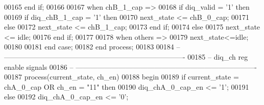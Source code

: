 \begin{DoxyCode}
00165          \textcolor{keywordflow}{end} \textcolor{keywordflow}{if};
00166          
00167       \textcolor{keywordflow}{when} \textcolor{vhdlchar}{chB\_1\_cap} \textcolor{vhdlchar}{=}\textcolor{vhdlchar}{>}
00168          \textcolor{keywordflow}{if} \textcolor{vhdlchar}{diq_valid} \textcolor{vhdlchar}{=} \textcolor{vhdlchar}{'}\textcolor{vhdllogic}{}\textcolor{vhdllogic}{1}\textcolor{vhdlchar}{'} \textcolor{keywordflow}{then}         
00169             \textcolor{keywordflow}{if} \textcolor{vhdlchar}{diq_chB_1_cap} \textcolor{vhdlchar}{=} \textcolor{vhdlchar}{'}\textcolor{vhdllogic}{}\textcolor{vhdllogic}{1}\textcolor{vhdlchar}{'} \textcolor{keywordflow}{then}
00170                \textcolor{vhdlchar}{next_state} \textcolor{vhdlchar}{<=} \textcolor{vhdlchar}{chB\_0\_cap};              
00171             \textcolor{keywordflow}{else} 
00172                \textcolor{vhdlchar}{next_state} \textcolor{vhdlchar}{<=} \textcolor{vhdlchar}{chB\_1\_cap};
00173             \textcolor{keywordflow}{end} \textcolor{keywordflow}{if};
00174          \textcolor{keywordflow}{else}
00175             \textcolor{vhdlchar}{next_state} \textcolor{vhdlchar}{<=} \textcolor{vhdlchar}{idle};
00176          \textcolor{keywordflow}{end} \textcolor{keywordflow}{if};
00177       
00178         \textcolor{keywordflow}{when} \textcolor{keywordflow}{others} \textcolor{vhdlchar}{=}\textcolor{vhdlchar}{>} 
00179             \textcolor{vhdlchar}{next_state}\textcolor{vhdlchar}{<=}\textcolor{vhdlchar}{idle};
00180          
00181     \textcolor{keywordflow}{end} \textcolor{keywordflow}{case};
00182 \textcolor{keywordflow}{end} \textcolor{keywordflow}{process};
00183 
00184 \textcolor{keyword}{-- ----------------------------------------------------------------------------}
00185 \textcolor{keyword}{-- diq\_ch reg enable signals}
00186 \textcolor{keyword}{-- ----------------------------------------------------------------------------}
00187 \textcolor{keywordflow}{process}(current_state, ch_en)
00188 \textcolor{vhdlkeyword}{begin }
00189    \textcolor{keywordflow}{if} \textcolor{vhdlchar}{current_state} \textcolor{vhdlchar}{=} \textcolor{vhdlchar}{chA\_0\_cap} \textcolor{keywordflow}{OR} \textcolor{vhdlchar}{ch_en} \textcolor{vhdlchar}{=} \textcolor{vhdllogic}{"11"} \textcolor{keywordflow}{then} 
00190       \textcolor{vhdlchar}{diq_chA_0_cap_en} \textcolor{vhdlchar}{<=} \textcolor{vhdlchar}{'}\textcolor{vhdllogic}{}\textcolor{vhdllogic}{1}\textcolor{vhdlchar}{'};
00191    \textcolor{keywordflow}{else} 
00192       \textcolor{vhdlchar}{diq_chA_0_cap_en} \textcolor{vhdlchar}{<=} \textcolor{vhdlchar}{'}\textcolor{vhdllogic}{}\textcolor{vhdllogic}{0}\textcolor{vhdlchar}{'};

\end{DoxyCode}
